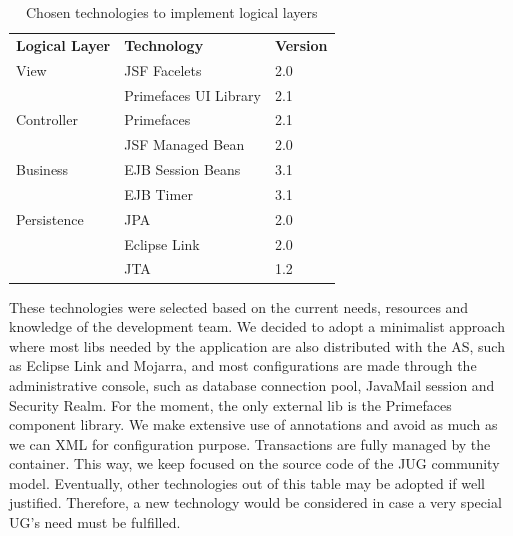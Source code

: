 \documentclass[10pt,a4paper]{report}
\begin{document}
\begin{table}
\begin{center}
\caption{Chosen technologies to implement logical layers}
\label{tbl:chosen-technologies}
\begin{tabular}{p{3cm}p{4cm}p{2cm}}
\hline \noalign{\smallskip}
\textbf{Logical Layer} & \textbf{Technology} & \textbf{Version} \\
\noalign{\smallskip}
\hline
View & JSF Facelets & 2.0 \\
 & Primefaces UI Library & 2.1 \\
Controller & Primefaces & 2.1 \\
 & JSF Managed Bean & 2.0 \\
Business & EJB Session Beans & 3.1 \\
 & EJB Timer & 3.1 \\
Persistence & JPA & 2.0 \\
 & Eclipse Link & 2.0 \\
 & JTA & 1.2 \\
\hline
\end{tabular}
\end{center}
\end{table}

These technologies were selected based on the current needs, resources and knowledge of the development team. We decided to adopt a minimalist approach where most libs needed by the application are also distributed with the AS, such as Eclipse Link and Mojarra, and most configurations are made through the administrative console, such as database connection pool, JavaMail session and Security Realm. For the moment, the only external lib is the Primefaces component library. We make extensive use of annotations and avoid as much as we can XML for configuration purpose. Transactions are fully managed by the container. This way, we keep focused on the source code of the JUG community model. Eventually, other technologies out of this table may be adopted if well justified. Therefore, a new technology would be considered in case a very special UG's need must be fulfilled.
\end{document}
